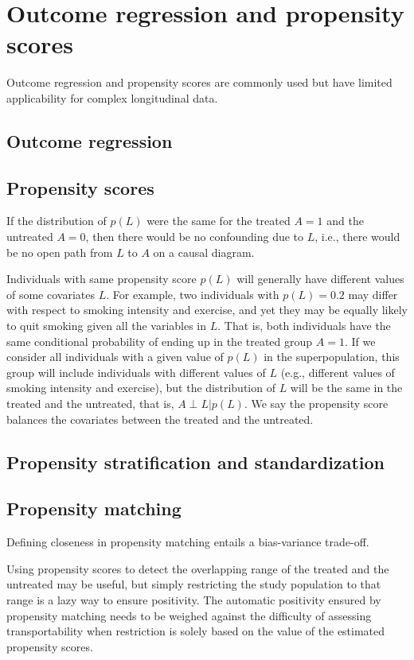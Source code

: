 \documentclass{article}
\begin{document}
\section{Outcome regression and propensity scores}
Outcome regression and propensity scores are commonly used but have limited applicability for complex longitudinal data.

\subsection{Outcome regression}

\subsection{Propensity scores}
If the distribution of $p(L)$ were the same for the treated $A=1$ and the untreated $A=0$, then there would be no confounding due to $L$, i.e., there would be no open path from $L$ to $A$ on a causal diagram.

Individuals with same propensity score $p(L)$ will generally have different values of some covariates $L$. For example, two individuals with $p(L)=0.2$ may differ with respect to smoking intensity and exercise, and yet they may be equally likely to quit smoking given all the variables in $L$. That is, both individuals have the same conditional probability of ending up in the treated group $A=1$. If we consider all individuals with a given value of $p(L)$ in the superpopulation, this group will include individuals with different values of $L$ (e.g., different values of smoking intensity and exercise), but the distribution of $L$ will be the same in the treated and the untreated, that is, $A \perp L | p(L)$. We say the propensity score balances the covariates between the treated and the untreated.

\subsection{Propensity stratification and standardization}

\subsection{Propensity matching}
Defining closeness in propensity matching entails a bias-variance trade-off.

Using propensity scores to detect the overlapping range of the treated and the untreated may be useful, but simply restricting the study population to that range is a lazy way to ensure positivity. The automatic positivity ensured by propensity matching needs to be weighed against the difficulty of assessing transportability when restriction is solely based on the value of the estimated propensity scores.
\end{document}

